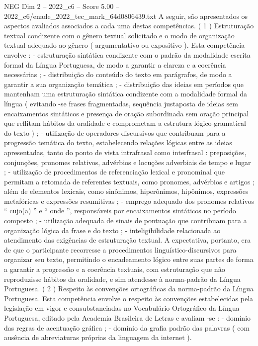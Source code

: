 \begin{textsample}{NEG Dim 2 – 2022\_c6 – Score 5.00 – 2022\_c6/enade\_2022\_tec\_mark\_64d0806439.txt}
A seguir, são apresentados os aspectos avaliados associados a cada uma destas competências. ( 1 ) Estruturação textual condizente com o gênero textual solicitado e o modo de organização textual adequado ao gênero ( argumentativo ou expositivo ).
Esta competência envolve : - estruturação sintática condizente com o padrão da modalidade escrita formal da Língua Portuguesa, de modo a garantir a clareza e a coerência necessárias ; - distribuição do conteúdo do texto em parágrafos, de modo a garantir a sua organização temática ; - distribuição das ideias em períodos que mantenham uma estruturação sintática condizente com a modalidade formal da língua ( evitando -se frases fragmentadas, sequência justaposta de ideias sem encaixamentos sintáticos e presença de oração subordinada sem oração principal que reflitam hábitos da oralidade e comprometam a estrutura lógico-gramatical do texto ) ; - utilização de operadores discursivos que contribuam para a progressão temática do texto, estabelecendo relações lógicas entre as ideias apresentadas, tanto do ponto de vista intrafrasal como interfrasal : preposições, conjunções, pronomes relativos, advérbios e locuções adverbiais de tempo e lugar ; - utilização de procedimentos de referenciação lexical e pronominal que permitam a retomada de referentes textuais, como pronomes, advérbios e artigos ; além de elementos lexicais, como sinônimos, hiperônimos, hipônimos, expressões metafóricas e expressões resumitivas ; - emprego adequado dos pronomes relativos “ cujo(a) ” e “ onde ”, responsáveis por encaixamentos sintáticos no período composto ; - utilização adequada de sinais de pontuação que contribuam para a organização lógica da frase e do texto ; - inteligibilidade relacionada ao atendimento das exigências de estruturação textual.
A expectativa, portanto, era de que o participante recorresse a procedimentos linguístico-discursivos para organizar seu texto, permitindo o encadeamento lógico entre suas partes de forma a garantir a progressão e a coerência textuais, com estruturação que não reproduzisse hábitos da oralidade, e sim atendesse à norma-padrão da Língua Portuguesa. ( 2 ) Respeito às convenções ortográficas da norma-padrão da Língua Portuguesa.
Esta competência envolve o respeito às convenções estabelecidas pela legislação em vigor e consubstanciadas no Vocabulário Ortográfico da Língua Portuguesa, editado pela Academia Brasileira de Letras e avaliam -se : - domínio das regras de acentuação gráfica ; - domínio da grafia padrão das palavras ( com ausência de abreviaturas próprias da linguagem da internet ).

\end{textsample}
